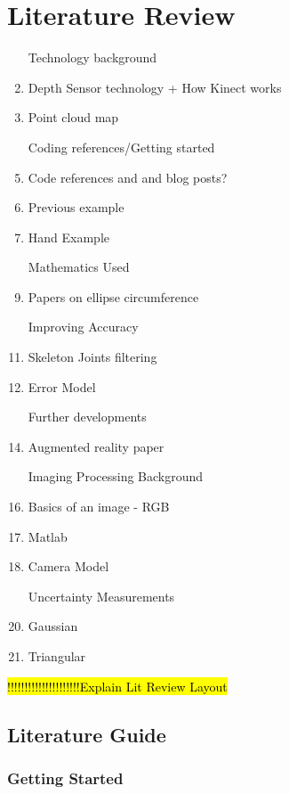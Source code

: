 \chapter{Literature Review}

\begin{enumerate}
	\item [Technology] background 
	\item Depth Sensor technology + How Kinect works
	\item Point cloud map
	
	\item [Coding] references/Getting started
	\item Code references and and blog posts? 
	\item Previous example
	\item Hand Example
	
	\item [Mathematics] Used
	\item Papers on ellipse circumference
	
	\item [Improving] Accuracy
	\item Skeleton Joints filtering
	\item Error Model
	
	\item [Further] developments
	\item Augmented reality paper
	
	\item [Imaging] Processing Background
	\item Basics of an image - RGB
	\item Matlab
	\item Camera Model
	
	\item [Uncertainty] Measurements
	\item Gaussian 
	\item Triangular
\end{enumerate}

\hl{!!!!!!!!!!!!!!!!!!!!!Explain Lit Review Layout}\\

\section{Literature Guide}
\subsection{Getting Started}

